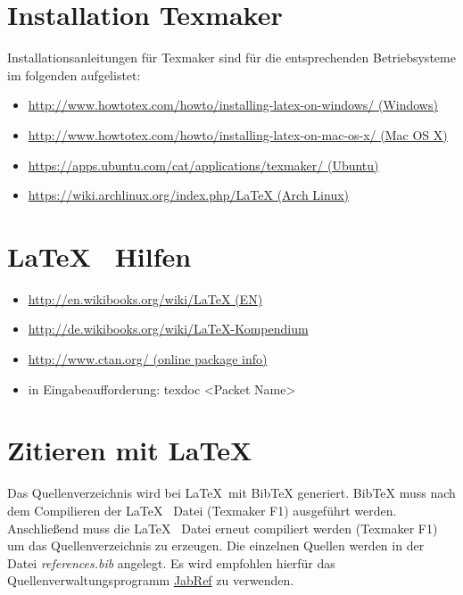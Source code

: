 \documentclass[TGAI_Laborbericht.tex]{subfiles}
\begin{document}
\section{Installation Texmaker}
Installationsanleitungen für Texmaker sind für die entsprechenden Betriebsysteme im folgenden aufgelistet:
\begin{itemize}
	\item \href{http://www.howtotex.com/howto/installing-latex-on-windows/}{http://www.howtotex.com/howto/installing-latex-on-windows/ (Windows)}
	\item \href{http://www.howtotex.com/howto/installing-latex-on-mac-os-x/}{http://www.howtotex.com/howto/installing-latex-on-mac-os-x/ (Mac OS X)}
	\item \href{https://apps.ubuntu.com/cat/applications/texmaker/}{https://apps.ubuntu.com/cat/applications/texmaker/ (Ubuntu)}
	\item \href{https://wiki.archlinux.org/index.php/LaTeX}{https://wiki.archlinux.org/index.php/LaTeX (Arch Linux)}
\end{itemize}


\section{\LaTeX ~ Hilfen}
\begin{itemize}
  \item \href{http://en.wikibooks.org/wiki/LaTeX}{http://en.wikibooks.org/wiki/LaTeX (EN)}
  \item \href{http://de.wikibooks.org/wiki/LaTeX-Kompendium}{http://de.wikibooks.org/wiki/LaTeX-Kompendium}
  \item \href{http://www.ctan.org/}{http://www.ctan.org/ (online package info)}
  \item in Eingabeaufforderung: texdoc <Packet Name>
\end{itemize}
\newpage

\section{Zitieren mit \LaTeX}
Das Quellenverzeichnis wird bei \LaTeX ~mit BibTeX generiert. BibTeX muss nach dem Compilieren der \LaTeX~ Datei (Texmaker F1) ausgeführt werden. Anschließend muss die \LaTeX~ Datei erneut compiliert werden (Texmaker F1) um das Quellenverzeichnis zu erzeugen. Die einzelnen Quellen werden in der Datei \textit{references.bib} angelegt. Es wird empfohlen hierfür das Quellenverwaltungsprogramm \href{http://jabref.sourceforge.net/}{JabRef} zu verwenden.
\end{document}
